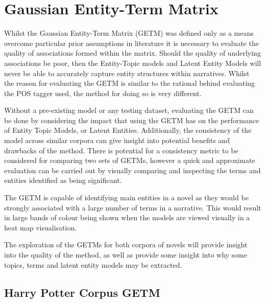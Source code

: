 \documentclass[10pt]{report}
\begin{document}
\clearpage
\section{Gaussian Entity-Term Matrix}
Whilst the Gaussian Entity-Term Matrix (GETM) was defined only as a means overcome particular prior assumptions in literature it is necessary to evaluate the quality of associations formed within the matrix. Should the quality of underlying associations be poor, then the Entity-Topic models and Latent Entity Models will never be able to accurately capture entity structures within narratives. Whilst the reason for evaluating the GETM is similar to the rational behind evaluating the POS tagger used, the method for doing so is very different.

Without a pre-existing model or any testing dataset, evaluating the GETM can be done by considering the impact that using the GETM has on the performance of Entity Topic Models, or Latent Entities. Additionally, the consistency of the model across similar corpora can give insight into potential benefits and drawbacks of the method. There is potential for a consistency metric to be considered for comparing two sets of GETMs, however a quick and approximate evaluation can be carried out by visually comparing and inspecting the terms and entities identified as being significant.

The GETM is capable of identifying main entities in a novel as they would be strongly associated with a large number of terms in a narrative. This would result in large bands of colour being shown when the models are viewed visually in a heat map visualisation.

The exploration of the GETMs for both corpora of novels will provide insight into the quality of the method, as well as provide some insight into why some topics, terms and latent entity models may be extracted.

\clearpage
\subsection{Harry Potter Corpus GETM}
\end{document}
